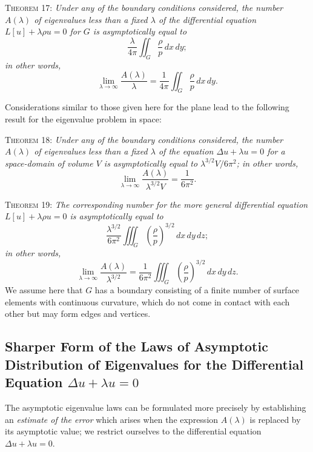 \textsc{Theorem 17:} \emph{Under any of the boundary conditions considered, the number $A(\lambda)$ of eigenvalues less than a fixed $\lambda$ of the differential equation $L[u]+\lambda\rho u=0$ for $G$ is asymptotically equal to}
\[
\frac{\lambda}{4\pi}\iint_G\frac{\rho}{p}\,dx\,dy;
\]
\emph{in other words,}
\[
\lim_{\lambda\to\infty}\frac{A(\lambda)}{\lambda}
=\frac1{4\pi}\iint_G\frac{\rho}{p}\,dx\,dy.
\]

Considerations similar to those given here for the plane lead to the following result for the eigenvalue problem in space:

\textsc{Theorem 18:} \emph{Under any of the boundary conditions considered, the number $A(\lambda)$ of eigenvalues less than a fixed $\lambda$ of the equation $\Delta u+\lambda u=0$ for a space-domain of volume $V$ is asymptotically equal to $\lambda^{3/2}V/6\pi^2$; in other words,}
\begin{equation}\tag{35}
\lim_{\lambda\to\infty}\frac{A(\lambda)}{\lambda^{3/2}V}=\frac1{6\pi^2}.
\end{equation}

\textsc{Theorem 19:} \emph{The corresponding number for the more general differential equation $L[u]+\lambda\rho u=0$ is asymptotically equal to}
\[
\frac{\lambda^{3/2}}{6\pi^2}\iiint_G\left(\frac{\rho}{p}\right)^{3/2}\,dx\,dy\,dz;
\]
\emph{in other words,}
\begin{equation}\tag{36}
\lim_{\lambda\to\infty}\frac{A(\lambda)}{\lambda^{3/2}}
=\frac1{6\pi^2}\iiint_G\left(\frac{\rho}{p}\right)^{3/2}\,dx\,dy\,dz.
\end{equation}
We assume here that $G$ has a boundary consisting of a finite number of surface elements with continuous curvature, which do not come in contact with each other but may form edges and vertices.

\subsection{Sharper Form of the Laws of Asymptotic Distribution of Eigenvalues for the Differential Equation $\Delta u+\lambda u=0$}
The asymptotic eigenvalue laws can be formulated more precisely by establishing an \emph{estimate of the error} which arises when the expression $A(\lambda)$ is replaced by its asymptotic value; we restrict ourselves to the differential equation $\Delta u+\lambda u=0$.

